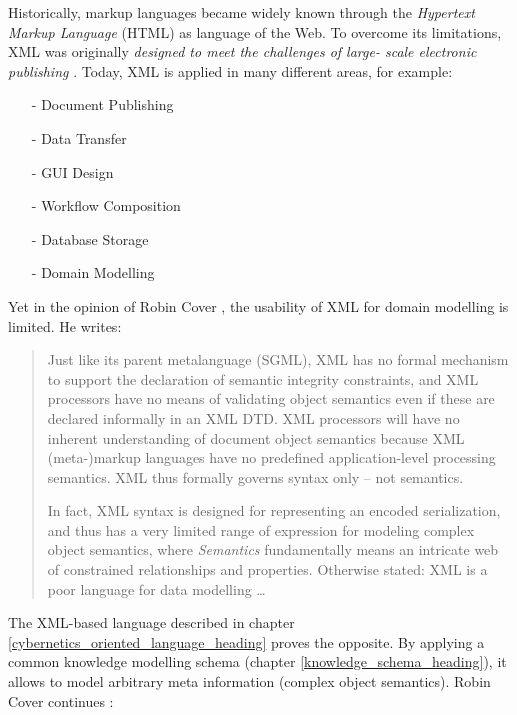 Historically, markup languages became widely known through the
\emph{Hypertext Markup Language} (HTML) as language of the Web. To overcome its
limitations, XML was originally \emph{designed to meet the challenges of large-
scale electronic publishing} \cite{xml}. Today, XML is applied in many different
areas, for example:

\begin{itemize}
    \item[-] Document Publishing \cite{docbook}
    \item[-] Data Transfer \cite{soap}
    \item[-] GUI Design \cite{xul, uiml, ecml, xaml}
    \item[-] Workflow Composition \cite{oio, intershop}
    \item[-] Database Storage \cite{exist, dbxml}
    \item[-] Domain Modelling \cite{xmlschema, damloil}
\end{itemize}

Yet in the opinion of Robin Cover \cite{xmlsemantics}, the usability of XML for
domain modelling is limited. He writes:

\begin{quote}
    Just like its parent metalanguage (SGML), XML has no formal mechanism to
    support the declaration of semantic integrity constraints, and XML processors
    have no means of validating object semantics even if these are declared
    informally in an XML DTD. XML processors will have no inherent understanding
    of document object semantics because XML (meta-)markup languages have no
    predefined application-level processing semantics. XML thus formally governs
    syntax only -- not semantics.

    In fact, XML syntax is designed for representing an encoded serialization,
    and thus has a very limited range of expression for modeling complex object
    semantics, where \emph{Semantics} fundamentally means an intricate web of
    constrained relationships and properties. Otherwise stated: XML is a poor
    language for data modelling \ldots
\end{quote}

The XML-based language described in chapter \ref{cybernetics_oriented_language_heading}
proves the opposite. By applying a common knowledge modelling schema (chapter
\ref{knowledge_schema_heading}), it allows to model arbitrary meta information
(complex object semantics). Robin Cover continues \cite{xmlsemantics}:

